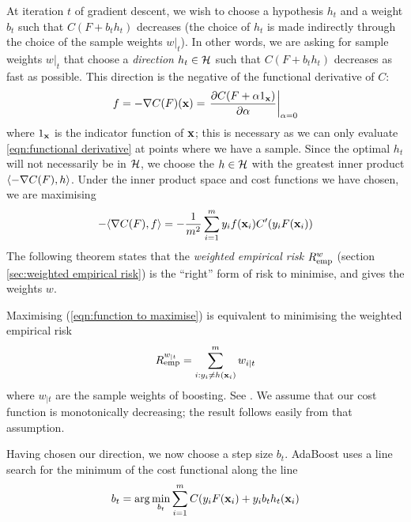 At iteration $t$ of gradient descent, we wish to choose a hypothesis $h_t$ and
a weight $b_t$ such that $C(F + b_t h_t)$ decreases (the choice of
$h_t$ is made indirectly through the choice of the sample weights
$w|_t$).  In other words, we are asking for sample weights $w|_t$ that
choose a \emph{direction} $h_t \in \mathcal{H}$ such that $C(F + b_t h_t)$
decreases as fast as possible.  This direction is the negative of the
functional derivative of $C$:
%
\begin{equation}
f = -\nabla C(F)(\mathbf{x}) = \left. \frac{\partial C(F + \alpha
1_{\mathbf{x}})}{\partial \alpha} \right|_{\alpha = 0}
\label{eqn:functional derivative}
\end{equation}
%
where $1_{\mathbf{x}}$ is the indicator function of $\mathbf{x}$; this is
necessary as we can only evaluate \ref{eqn:functional derivative} at
points where we have a sample.  Since the optimal $h_t$ will not
necessarily be in $\mathcal{H}$, we choose the $h \in \mathcal{H}$ with the
greatest inner product $\langle {-\nabla C(F)} , {h} \rangle$.  Under the inner
product space and cost functions we have chosen, we are maximising
%
\begin{equation}
- \langle {\nabla C(F)} , {f} \rangle = - \frac{1}{m^2} \sum_{i=1}^{m} y_i f(\mathbf{x}_i)
  C'(y_i F(\mathbf{x}_i))
\label{eqn:function to maximise}
\end{equation}
%
The following theorem states that the \emph{weighted empirical risk}
$R_{\mathrm{emp}}^{w}$ (section \ref{sec:weighted empirical risk}) is the
``right'' form of risk to minimise, and gives the weights $w$.

\begin{theorem}
Maximising (\ref{eqn:function to maximise}) is equivalent to
minimising the weighted empirical risk
%
\begin{equation}
R_{\mathrm{emp}}^{w_{|t}} = \sum_{i:y_i \neq h(\mathbf{x}_i)}^{m} w_{i|t}
\end{equation}
%
where $w_{|t}$ are the sample weights of boosting.
\proof See \cite{Mason99}.  We assume that our cost function is
monotonically decreasing; the result follows easily from that
assumption.
\end{theorem}

Having chosen our direction, we now choose a step size $b_t$.
AdaBoost uses a line search for the minimum of the cost functional
along the line
%
\begin{equation}
b_t = \arg \min_{b_t} \sum_{i=1}^{m} C(y_i F(\mathbf{x}_i) + y_i b_t h_t(\mathbf{x}_i)
\end{equation}
%

